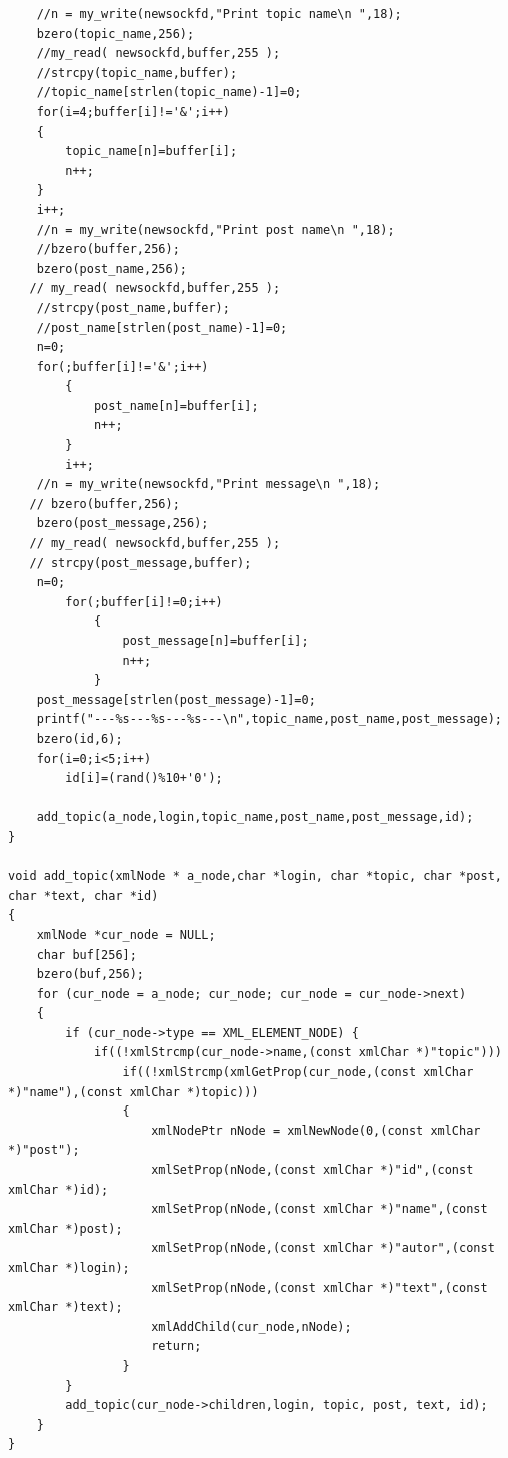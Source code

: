 \documentclass[10pt,a4paper]{report}
\begin{document}
\begin{verbatim}
    //n = my_write(newsockfd,"Print topic name\n ",18);
    bzero(topic_name,256);
    //my_read( newsockfd,buffer,255 );
    //strcpy(topic_name,buffer);
    //topic_name[strlen(topic_name)-1]=0;
    for(i=4;buffer[i]!='&';i++)
    {
    	topic_name[n]=buffer[i];
    	n++;
    }
    i++;
    //n = my_write(newsockfd,"Print post name\n ",18);
    //bzero(buffer,256);
    bzero(post_name,256);
   // my_read( newsockfd,buffer,255 );
    //strcpy(post_name,buffer);
    //post_name[strlen(post_name)-1]=0;
    n=0;
    for(;buffer[i]!='&';i++)
        {
        	post_name[n]=buffer[i];
        	n++;
        }
        i++;
    //n = my_write(newsockfd,"Print message\n ",18);
   // bzero(buffer,256);
    bzero(post_message,256);
   // my_read( newsockfd,buffer,255 );
   // strcpy(post_message,buffer);
    n=0;
        for(;buffer[i]!=0;i++)
            {
            	post_message[n]=buffer[i];
            	n++;
            }
    post_message[strlen(post_message)-1]=0;
    printf("---%s---%s---%s---\n",topic_name,post_name,post_message);
    bzero(id,6);
    for(i=0;i<5;i++)
        id[i]=(rand()%10+'0');

    add_topic(a_node,login,topic_name,post_name,post_message,id);
}

void add_topic(xmlNode * a_node,char *login, char *topic, char *post, char *text, char *id)
{
    xmlNode *cur_node = NULL;
    char buf[256];
    bzero(buf,256);
    for (cur_node = a_node; cur_node; cur_node = cur_node->next)
    {
        if (cur_node->type == XML_ELEMENT_NODE) {
            if((!xmlStrcmp(cur_node->name,(const xmlChar *)"topic")))
                if((!xmlStrcmp(xmlGetProp(cur_node,(const xmlChar *)"name"),(const xmlChar *)topic)))
                {
                    xmlNodePtr nNode = xmlNewNode(0,(const xmlChar *)"post");
                    xmlSetProp(nNode,(const xmlChar *)"id",(const xmlChar *)id);
                    xmlSetProp(nNode,(const xmlChar *)"name",(const xmlChar *)post);
                    xmlSetProp(nNode,(const xmlChar *)"autor",(const xmlChar *)login);
                    xmlSetProp(nNode,(const xmlChar *)"text",(const xmlChar *)text);
                    xmlAddChild(cur_node,nNode);
                    return;
                }
        }
        add_topic(cur_node->children,login, topic, post, text, id);
    }
}

\end{verbatim}
\end{document}

